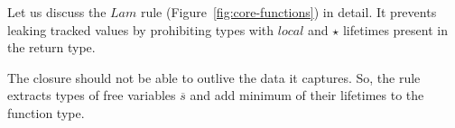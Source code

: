 \documentclass[11pt]{article}
\begin{document}
    Let us discuss the $Lam$ rule (Figure\ \ref{fig:core-functions}) in detail.
    It prevents leaking tracked values by prohibiting types with $local$ and $\star$ lifetimes present in the return type.

    The closure should not be able to outlive the data it captures.
    So, the rule extracts types of free variables $\overline{s}$ and add minimum of their lifetimes to the function type.







\end{document}
